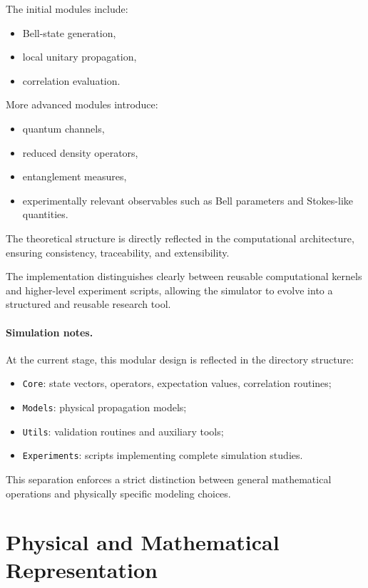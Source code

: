 \documentclass[a4paper]{article}
\begin{document}
The initial modules include:
\begin{itemize}
    \item Bell-state generation,
    \item local unitary propagation,
    \item correlation evaluation.
\end{itemize}

More advanced modules introduce:
\begin{itemize}
    \item quantum channels,
    \item reduced density operators,
    \item entanglement measures,
    \item experimentally relevant observables such as Bell parameters and Stokes-like quantities.
\end{itemize}

The theoretical structure is directly reflected in the computational architecture, ensuring consistency, traceability, and extensibility.

The implementation distinguishes clearly between reusable computational kernels and higher-level experiment scripts, allowing the simulator to evolve into a structured and reusable research tool.

\paragraph{Simulation notes.}
At the current stage, this modular design is reflected in the directory structure:
\begin{itemize}
    \item \texttt{Core}: state vectors, operators, expectation values, correlation routines;
    \item \texttt{Models}: physical propagation models;
    \item \texttt{Utils}: validation routines and auxiliary tools;
    \item \texttt{Experiments}: scripts implementing complete simulation studies.
\end{itemize}

This separation enforces a strict distinction between general mathematical operations and physically specific modeling choices.

\section{Physical and Mathematical Representation}
\end{document}
